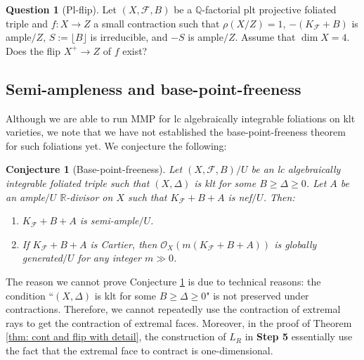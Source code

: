 \documentclass[11pt]{amsart}
\numberwithin{equation}{section}
\newcommand{\Qq}{\mathbb{Q}}
\newcommand{\Rr}{\mathbb{R}}
\newcommand{\Ff}{\mathcal{F}}
\newtheorem{conj}[thm]{Conjecture}
\theoremstyle{definition}
\newtheorem{ques}[thm]{Question}
\theoremstyle{definition}
\theoremstyle{definition}
\begin{document}
\begin{ques}[Pl-flip]
    Let $(X,\Ff,B)$ be a $\Qq$-factorial plt projective foliated triple and $f: X\rightarrow Z$ a small contraction such that $\rho(X/Z)=1$, $-(K_\Ff+B)$ is ample$/Z$, $S:=\lfloor B\rfloor$ is irreducible, and $-S$ is ample$/Z$. Assume that $\dim X=4$. Does the flip $X^+\rightarrow Z$ of $f$ exist?
\end{ques}

\subsection{Semi-ampleness and base-point-freeness}

Although we are able to run MMP for lc algebraically integrable foliations on klt varieties, we note that we have not established the base-point-freeness theorem for such foliations yet. We conjecture the following:

\begin{conj}[Base-point-freeness]\label{conj: base-point-freeness theorem}
    Let $(X,\Ff,B)/U$ be an lc algebraically integrable foliated triple such that $(X,\Delta)$ is klt for some $B\geq\Delta\geq 0$. Let $A$ be an ample$/U$ $\Rr$-divisor on $X$ such that $K_{\Ff}+B+A$ is nef$/U$. Then:
    \begin{enumerate}
        \item $K_{\Ff}+B+A$ is semi-ample$/U$.
        \item If $K_{\Ff}+B+A$ is Cartier, then $\mathcal{O}_X(m(K_{\Ff}+B+A))$ is globally generated$/U$ for any integer $m\gg 0$.
    \end{enumerate}
\end{conj}
The reason we cannot prove Conjecture \ref{conj: base-point-freeness theorem} is due to technical reasons: the condition ``$(X,\Delta)$ is klt for some $B\geq\Delta\geq 0$" is not preserved under contractions. Therefore, we cannot repeatedly use the contraction of extremal rays to get the contraction of extremal faces. Moreover, in the proof of Theorem \ref{thm: cont and flip with detail}, the construction of $L_R$ in \textbf{Step 5} essentially use the fact that the extremal face to contract is one-dimensional. 
\end{document}
